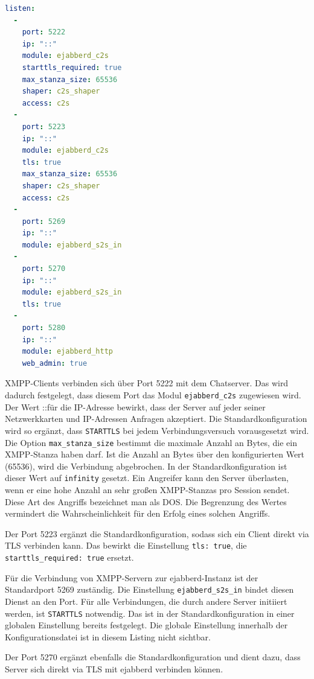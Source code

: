 \documentclass[a4paper,titlepage,halfparskip,12pt]{scrreprt}
\begin{document}
\begin{onehalfspacing}
\bigskip

\begin{lstlisting}[language=yaml, caption={Konfiguration der Ports}, label={lst:ejabberdPortsConfig}]
listen:
  -
    port: 5222
    ip: "::"
    module: ejabberd_c2s
    starttls_required: true
    max_stanza_size: 65536
    shaper: c2s_shaper
    access: c2s
  -
    port: 5223
    ip: "::"
    module: ejabberd_c2s
    tls: true
    max_stanza_size: 65536
    shaper: c2s_shaper
    access: c2s
  -
    port: 5269
    ip: "::"
    module: ejabberd_s2s_in
  -
    port: 5270
    ip: "::"
    module: ejabberd_s2s_in
    tls: true
  -
    port: 5280
    ip: "::"
    module: ejabberd_http
    web_admin: true
\end{lstlisting}

\ac{XMPP}-Clients verbinden sich über Port 5222 mit dem Chatserver. Das wird dadurch festgelegt, dass diesem Port das Modul \texttt{ejabberd\_c2s} zugewiesen wird. Der Wert \glqq ::\grqq für die IP-Adresse bewirkt, dass der Server auf jeder seiner Netzwerkkarten und IP-Adressen Anfragen akzeptiert. Die Standardkonfiguration wird so ergänzt, dass \texttt{STARTTLS} bei jedem Verbindungsversuch vorausgesetzt wird. Die Option \texttt{max\_stanza\_size} bestimmt die maximale Anzahl an Bytes, die ein \ac{XMPP}-Stanza haben darf. Ist die Anzahl an Bytes über den konfigurierten Wert (65536), wird die Verbindung abgebrochen. In der Standardkonfiguration ist dieser Wert auf \texttt{infinity} gesetzt. Ein Angreifer kann den Server überlasten, wenn er eine hohe Anzahl an sehr großen \ac{XMPP}-Stanzas pro Session sendet. Diese Art des Angriffs bezeichnet man als \ac{DOS}. Die Begrenzung des Wertes vermindert die Wahrscheinlichkeit für den Erfolg eines solchen Angriffs.\cite{XMPPDOS}

Der Port 5223 ergänzt die Standardkonfiguration, sodass sich ein Client direkt via \ac{TLS} verbinden kann. Das bewirkt die Einstellung \texttt{tls: true}, die \texttt{starttls\_required: true} ersetzt.

Für die Verbindung von \ac{XMPP}-Servern zur ejabberd-Instanz ist der Standardport 5269 zuständig. Die Einstellung \texttt{ejabberd\_s2s\_in} bindet diesen Dienst an den Port. Für alle Verbindungen, die durch andere Server initiiert werden, ist \texttt{STARTTLS} notwendig. Das ist in der Standardkonfiguration in einer globalen Einstellung bereits festgelegt. Die globale Einstellung innerhalb der Konfigurationsdatei ist in diesem Listing nicht sichtbar.

Der Port 5270 ergänzt ebenfalls die Standardkonfiguration und dient dazu, dass Server sich direkt via \ac{TLS} mit ejabberd verbinden können.


\end{onehalfspacing}
\end{document}
